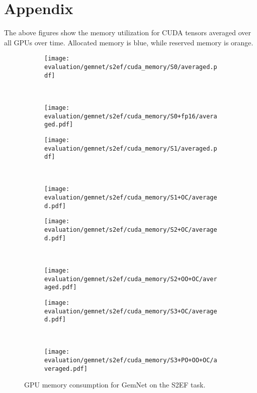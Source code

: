 \section*{Appendix}

The above figures show the memory utilization for 
CUDA tensors averaged over all GPUs over time. 
Allocated memory is \textcolor{tum-dark-blue}{blue},
while reserved memory is \textcolor{tum-orange}{orange}.

\begin{figure}[H]

    \centering

    \begin{subfigure}[t]{0.45\textwidth}
        \centering
        \texttt{[image: evaluation/gemnet/s2ef/cuda\_memory/S0/averaged.pdf]}
    \end{subfigure}%
    ~
    \begin{subfigure}[t]{0.45\textwidth}
        \centering
        \texttt{[image: evaluation/gemnet/s2ef/cuda\_memory/S0+fp16/averaged.pdf]}
    \end{subfigure}

    \begin{subfigure}[t]{0.45\textwidth}
        \centering
        \texttt{[image: evaluation/gemnet/s2ef/cuda\_memory/S1/averaged.pdf]}
    \end{subfigure}%
    ~
    \begin{subfigure}[t]{0.45\textwidth}
        \centering
        \texttt{[image: evaluation/gemnet/s2ef/cuda\_memory/S1+OC/averaged.pdf]}
    \end{subfigure}

    \begin{subfigure}[t]{0.45\textwidth}
        \centering
        \texttt{[image: evaluation/gemnet/s2ef/cuda\_memory/S2+OC/averaged.pdf]}
    \end{subfigure}%
    ~
    \begin{subfigure}[t]{0.45\textwidth}
        \centering
        \texttt{[image: evaluation/gemnet/s2ef/cuda\_memory/S2+OO+OC/averaged.pdf]}
    \end{subfigure}

    \begin{subfigure}[t]{0.45\textwidth}
        \centering
        \texttt{[image: evaluation/gemnet/s2ef/cuda\_memory/S3+OC/averaged.pdf]}
    \end{subfigure}%
    ~
    \begin{subfigure}[t]{0.45\textwidth}
        \centering
        \texttt{[image: evaluation/gemnet/s2ef/cuda\_memory/S3+PO+OO+OC/averaged.pdf]}
    \end{subfigure}

    \caption{GPU memory consumption for GemNet on the S2EF task.}
    
\end{figure}

